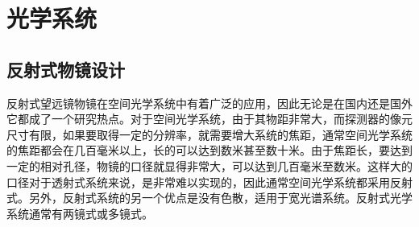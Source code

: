 \chapter{光学系统}\label{chap:Lens Design}
\section{反射式物镜设计}
反射式望远镜物镜在空间光学系统中有着广泛的应用，因此无论是在国内还是国外它都成了一个研究热点。对于空间光学系统，由于其物距非常大，而探测器的像元尺寸有限，如果要取得一定的分辨率，就需要增大系统的焦距，通常空间光学系统的焦距都会在几百毫米以上，长的可以达到数米甚至数十米。由于焦距长，要达到一定的相对孔径，物镜的口径就显得非常大，可以达到几百毫米至数米。这样大的口径对于透射式系统来说，是非常难以实现的，因此通常空间光学系统都采用反射式。另外，反射式系统的另一个优点是没有色散，适用于宽光谱系统。反射式光学系统通常有两镜式或多镜式。